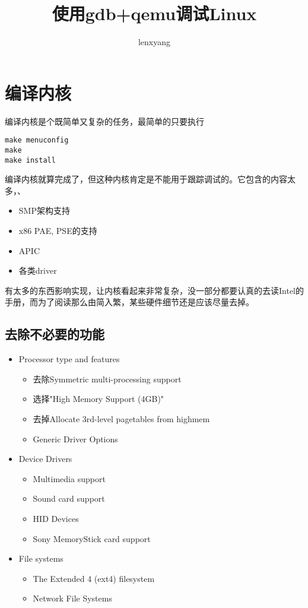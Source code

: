 \documentclass[b5paper,9pt,twoside,openany]{article}
\begin{document}
\title{使用gdb+qemu调试Linux}
\author{lenxyang}
\maketitle
\section{编译内核}
编译内核是个既简单又复杂的任务，最简单的只要执行
\begin{lstlisting}
make menuconfig
make
make install
\end{lstlisting}
编译内核就算完成了，但这种内核肯定是不能用于跟踪调试的。它包含的内容太多，、
\begin{itemize}
\item SMP架构支持
\item x86 PAE, PSE的支持
\item APIC
\item 各类driver
\end{itemize}
有太多的东西影响实现，让内核看起来非常复杂，没一部分都要认真的去读Intel的手册，而为了阅读那么由简入繁，某些硬件细节还是应该尽量去掉。
\subsection{去除不必要的功能}
\begin{itemize}
\item Processor type and features
\begin{itemize}
\item 去除Symmetric multi-processing support
\item 选择"High Memory Support (4GB)"
\item 去掉Allocate 3rd-level pagetables from highmem
\item Generic Driver Options
\end{itemize}
\item Device Drivers
\begin{itemize}
\item Multimedia support
\item Sound card support
\item HID Devices
\item Sony MemoryStick card support
\end{itemize}
\item{File systems}
\begin{itemize}
\item The Extended 4 (ext4) filesystem
\item Network File Systems
\end{itemize}
\end{itemize}
\end{document}
